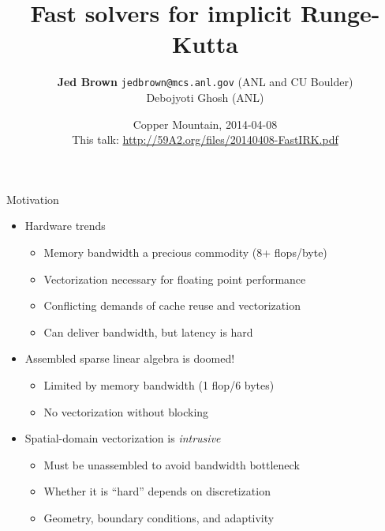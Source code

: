 \documentclass{beamer}
\title{Fast solvers for implicit Runge-Kutta}
\author{{\bf Jed Brown} \texttt{jedbrown@mcs.anl.gov} (ANL and CU Boulder) \\
  Debojyoti Ghosh (ANL)}
\date{Copper Mountain, 2014-04-08 \\
This talk: \url{http://59A2.org/files/20140408-FastIRK.pdf}}
\begin{document}
\lstset{language=C}
\normalem

\begin{frame}
  \titlepage
\end{frame}

\begin{frame}{Motivation}
  \begin{itemize}
  \item Hardware trends
    \begin{itemize}
    \item Memory bandwidth a precious commodity (8+ flops/byte)
    \item Vectorization necessary for floating point performance
    \item Conflicting demands of cache reuse and vectorization
    \item Can deliver bandwidth, but latency is hard
    \end{itemize}
  \item Assembled sparse linear algebra is doomed!
    \begin{itemize}
    \item Limited by memory bandwidth (1 flop/6 bytes)
    \item No vectorization without blocking
    \end{itemize}
  \item Spatial-domain vectorization is \emph{intrusive}
    \begin{itemize}
    \item Must be unassembled to avoid bandwidth bottleneck
    \item Whether it is ``hard'' depends on discretization
    \item Geometry, boundary conditions, and adaptivity
    \end{itemize}
  \end{itemize}
\end{frame}
\end{document}
